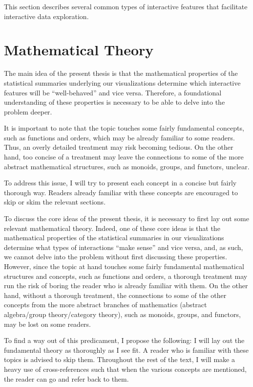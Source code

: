 \documentclass[
]{book}
\theoremstyle{definition}
\theoremstyle{definition}
\theoremstyle{definition}
\theoremstyle{definition}
\theoremstyle{remark}
\begin{document}
This section describes several common types of interactive features that facilitate interactive data exploration.

\section{Mathematical Theory}\label{mathematical-theory}

The main idea of the present thesis is that the mathematical properties of the statistical summaries underlying our visualizations determine which interactive features will be ``well-behaved'' and vice versa. Therefore, a foundational understanding of these properties is necessary to be able to delve into the problem deeper.

It is important to note that the topic touches some fairly fundamental concepts, such as functions and orders, which may be already familiar to some readers. Thus, an overly detailed treatment may risk becoming tedious. On the other hand, too concise of a treatment may leave the connections to some of the more abstract mathematical structures, such as monoids, groups, and functors, unclear.

To address this issue, I will try to present each concept in a concise but fairly thorough way. Readers already familiar with these concepts are encouraged to skip or skim the relevant sections.

To discuss the core ideas of the present thesis, it is necessary to first lay out some relevant mathematical theory. Indeed, one of these core ideas is that the mathematical properties of the statistical summaries in our visualizations determine what types of interactions ``make sense'' and vice versa, and, as such, we cannot delve into the problem without first discussing these properties. However, since the topic at hand touches some fairly fundamental mathematical structures and concepts, such as functions and orders, a thorough treatment may run the risk of boring the reader who is already familiar with them. On the other hand, without a thorough treatment, the connections to some of the other concepts from the more abstract branches of mathematics (abstract algebra/group theory/category theory), such as monoids, groups, and functors, may be lost on some readers.

To find a way out of this predicament, I propose the following: I will lay out the fundamental theory as thoroughly as I see fit. A reader who is familiar with these topics is advised to skip them. Throughout the rest of the text, I will make a heavy use of cross-references such that when the various concepts are mentioned, the reader can go and refer back to them.
\end{document}
